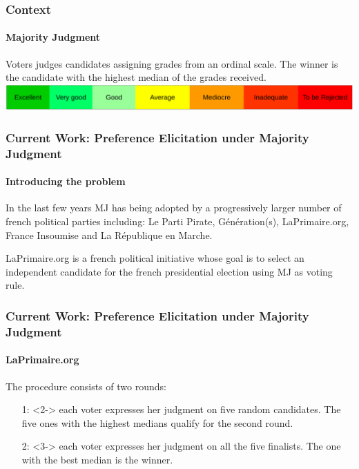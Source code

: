 \documentclass{beamer}
\begin{document}
\begin{frame}
	\frametitle{Context}
	\framesubtitle{Majority Judgment}
		Voters judges candidates assigning grades from an ordinal scale. The winner is the candidate with the highest median of the grades received. \vspace{1cm} \\
	\includegraphics[width=\textwidth]{vector}
\end{frame}

\begin{frame}
	\frametitle{\textbf{Current Work:} Preference Elicitation under Majority Judgment}
	\framesubtitle{Introducing the problem}
	 In the last few years MJ has being adopted by a progressively larger number of french political parties including: Le Parti Pirate, Génération(s), LaPrimaire.org, France Insoumise and La République en Marche. \vspace{1cm}
	
	 LaPrimaire.org is a french political initiative whose goal is to select an independent candidate for the french presidential election using MJ as voting rule.
\end{frame}

\begin{frame}
	\frametitle{\textbf{Current Work:} Preference Elicitation under Majority Judgment}
	\framesubtitle{LaPrimaire.org}
	The procedure consists of two rounds:
	\begin{itemize}
		\item[1:]<2-> each voter expresses her judgment on five random candidates. The five ones with the highest medians qualify for the second round. 
		\item[2:]<3-> each voter expresses her judgment on all the five finalists. The one with the best median is the winner.
	\end{itemize}
\end{frame}
\end{document}
